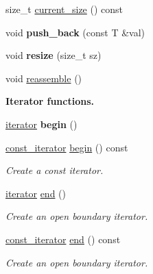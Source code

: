 \begin{DoxyCompactItemize}
\item 
size\+\_\+t \mbox{\hyperlink{classGis__wkb__vector_a740c7d54f53fb0e4da20f63b5211d9a2}{current\+\_\+size}} () const
\item 
\mbox{\label{classGis__wkb__vector_a5434d7f7e1af87e13fafde6eed3329f6}} 
void {\bfseries push\+\_\+back} (const T \&val)
\item 
\mbox{\label{classGis__wkb__vector_a13e2c0f2d7a66a3e297728585df06834}} 
void {\bfseries resize} (size\+\_\+t sz)
\item 
void \mbox{\hyperlink{classGis__wkb__vector_a570dda402fe9aef5438098fe5714086c}{reassemble}} ()
\end{DoxyCompactItemize}
\begin{Indent}\textbf{ Iterator functions.}\par
\begin{DoxyCompactItemize}
\item 
\mbox{\label{classGis__wkb__vector_a2ab4781853bc7f9018c0730c42204319}} 
\mbox{\hyperlink{classGis__wkb__vector__iterator}{iterator}} {\bfseries begin} ()
\item 
\mbox{\hyperlink{classGis__wkb__vector__const__iterator}{const\+\_\+iterator}} \mbox{\hyperlink{classGis__wkb__vector_a312062fdc578f38fec1b07912f53963f}{begin}} () const
\begin{DoxyCompactList}\small\item\em Create a const iterator. \end{DoxyCompactList}\item 
\mbox{\hyperlink{classGis__wkb__vector__iterator}{iterator}} \mbox{\hyperlink{classGis__wkb__vector_a0aba1035ea56f3a9d5ffe4b73efd6a24}{end}} ()
\begin{DoxyCompactList}\small\item\em Create an open boundary iterator. \end{DoxyCompactList}\item 
\mbox{\hyperlink{classGis__wkb__vector__const__iterator}{const\+\_\+iterator}} \mbox{\hyperlink{classGis__wkb__vector_a02a1d360d52ee8ecf407e320ec53f0ba}{end}} () const
\begin{DoxyCompactList}\small\item\em Create an open boundary iterator. \end{DoxyCompactList}\end{DoxyCompactItemize}
\end{Indent}

